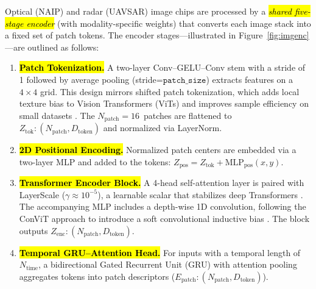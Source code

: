 \documentclass[remotesensing,article,accept,pdftex,moreauthors]{Definitions/mdpi}
\begin{document}


Optical (NAIP) and radar (UAVSAR) image chips are processed by a \emph{\hl{shared five-stage encoder}} (with modality-specific weights) that converts each image stack into a fixed set of patch tokens. The encoder stages—illustrated in Figure~\ref{fig:imgenc}—are outlined as follows:

\begin{enumerate}[leftmargin=*]      
\item \textbf{\hl{Patch Tokenization.}}  
      A two-layer Conv–GELU–Conv stem with a stride of 1 %
      followed by average pooling (stride=$\texttt{patch\_size}$) extracts features on a $4\times4$ grid. This design mirrors shifted patch tokenization, which adds local texture bias to Vision Transformers (ViTs) and improves sample efficiency on small datasets \cite{lee2021vision}. The \mbox{$N_{\text{patch}}=16$ patches} are flattened to $Z_{\text{tok}}: (N_{\text{patch}}, D_{\text{token}})$ and normalized via LayerNorm.


\item \textbf{\hl{2D Positional Encoding.}}  
      Normalized patch centers are embedded via a two-layer MLP and added to the tokens: $Z_{\text{pos}} = Z_{\text{tok}} + \text{MLP}_{\text{pos}}(x,y)$.

\item \textbf{\hl{Transformer Encoder Block.}}  
      A 4-head self-attention layer is paired with LayerScale ($\gamma \approx 10^{-5}$), a learnable scalar that stabilizes deep Transformers \cite{touvron2021going}. The accompanying MLP includes a depth-wise 1D convolution, following the ConViT approach to introduce a soft convolutional inductive bias \cite{dascoli2021convit}. The block outputs $Z_{\text{enc}}: (N_{\text{patch}}, D_{\text{token}})$.


\item \textbf{\hl{Temporal GRU–Attention Head.}}  
      For inputs with a temporal length of $N_{\text{time}}$, a bidirectional Gated Recurrent Unit (GRU) with attention pooling aggregates tokens into patch descriptors ($E_{\text{patch}}: (N_{\text{patch}}, D_{\text{token}})$).
\end{enumerate}
\end{document}
